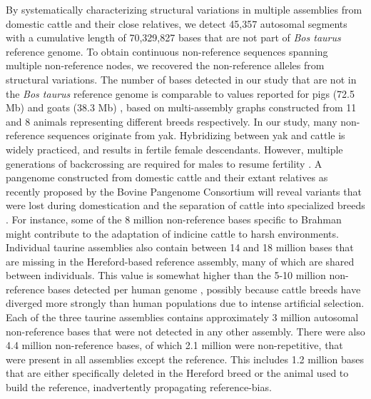 \documentclass[../main.tex]{subfiles}
\begin{document}
By systematically characterizing structural variations in multiple assemblies from domestic cattle and their close relatives, we detect 45,357 autosomal segments with a cumulative length of 70,329,827 bases that are not part of \emph{Bos taurus} reference genome. To obtain continuous non-reference sequences spanning multiple non-reference nodes, we recovered the non-reference alleles from structural variations. The number of bases detected in our study that are not in the \emph{Bos taurus }reference genome is comparable to values reported for pigs (72.5 Mb) \citep{tian2019building} and goats (38.3 Mb) \citep{li2019towards}, based on multi-assembly graphs constructed from 11 and 8 animals representing different breeds respectively. In our study, many non-reference sequences originate from yak. Hybridizing between yak and cattle is widely practiced, and results in fertile female descendants. However, multiple generations of backcrossing are required for males to resume fertility \citep{qi2010assessment}. A pangenome constructed from domestic cattle and their extant relatives as recently proposed by the Bovine Pangenome Consortium \citep{smith2020genome} will reveal variants that were lost during domestication and the separation of cattle into specialized breeds \citep{khan2020super}. For instance, some of the 8 million non-reference bases specific to Brahman might contribute to the adaptation of indicine cattle to harsh environments. Individual taurine assemblies also contain between 14 and 18 million bases that are missing in the Hereford-based reference assembly, many of which are shared between individuals. This value is somewhat higher than the 5-10 million non-reference bases detected per human genome \citep{ameur2018novo,audano2019characterizing,duan2019hupan}, possibly because cattle breeds have diverged more strongly than human populations due to intense artificial selection. Each of the three taurine assemblies contains approximately 3 million autosomal non-reference bases that were not detected in any other assembly. There were also 4.4 million non-reference bases, of which 2.1 million were non-repetitive, that were present in all assemblies except the reference. This includes 1.2 million bases that are either specifically deleted in the Hereford breed or the animal used to build the reference, inadvertently propagating reference-bias.
\end{document}
